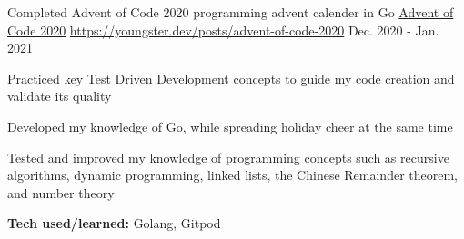 \begin{cventries}

    \vspace{-1em}
    \cventry
    {Completed Advent of Code 2020 programming advent calender in Go} %
    {\href{https://adventofcode.com/}{Advent of Code 2020}} %
    {\href{https://youngster.dev/posts/advent-of-code-2020}{https://youngster.dev/posts/advent-of-code-2020}} %
    {Dec. 2020 - Jan. 2021} %
    { %
        \begin{cvitems}
            \item {Practiced key Test Driven Development concepts to guide my code creation and validate its quality}
            \item {Developed my knowledge of Go, while spreading holiday cheer at the same time}
            \item {Tested and improved my knowledge of programming concepts such as recursive algorithms, dynamic programming, linked lists, the Chinese Remainder theorem, and number theory}
            \item {\textbf{Tech used/learned:} Golang, Gitpod}
        \end{cvitems}
    }


\end{cventries}
